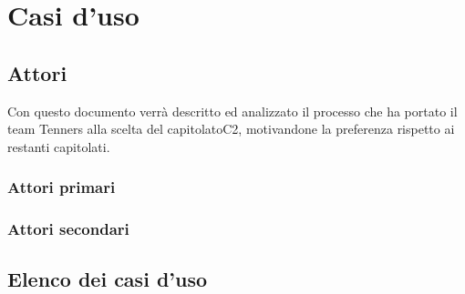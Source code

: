 \section{Casi d'uso}

\subsection{Attori}
Con questo documento verrà descritto ed analizzato il processo che ha portato il team Tenners alla scelta del capitolato\glo C2, motivandone la preferenza rispetto ai restanti capitolati.
\subsubsection{Attori primari}
\subsubsection{Attori secondari}

\subsection{Elenco dei casi d'uso}